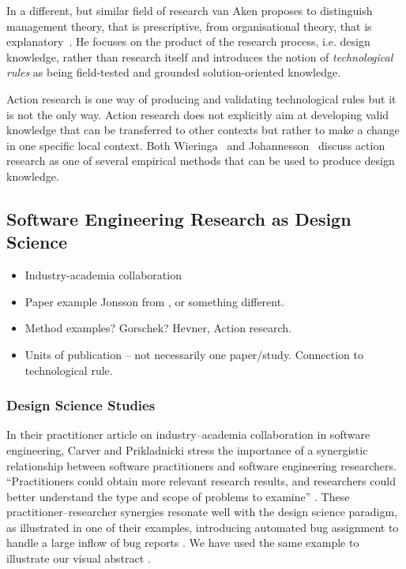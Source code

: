 \documentclass[graybox]{svmult}
\begin{document}
In a different, but similar field of research van Aken proposes to distinguish management theory, that is prescriptive, from organisational theory, that is explanatory~\cite{van_aken_management_2005}. He focuses on the product of the research process, i.e. design knowledge, rather than research itself and introduces the notion of \emph{technological rules} as being field-tested and grounded solution-oriented knowledge. 

Action research is one way of producing and validating technological rules but it is not the only way. Action research does not explicitly aim at developing valid knowledge that can be transferred to other contexts but rather to make a change in one specific local context. Both Wieringa~\cite{wieringa_technical_2012} and Johannesson~\cite{johannesson_introduction_2014} discuss action research as one of several empirical methods that can be used to produce design knowledge.






\subsection{Software Engineering Research as Design Science}
\begin{itemize}
\item Industry-academia collaboration
\item Paper example Jonsson \cite{JonssonBug15} from \cite{StoreyESEM17}, or something different.
\item Method examples? Gorschek? \cite{GorschekSW2006} Hevner, Action research.
\item Units of publication -- not necessarily one paper/study. Connection to technological rule.
\end{itemize}

\subsubsection{Design Science Studies}
In their practitioner article on industry--academia collaboration in software engineering, Carver and Prikladnicki stress the importance of a synergistic relationship between software practitioners and software engineering researchers. ``Practitioners could obtain more relevant research results, and researchers could better understand the type and scope of problems to examine'' \cite{CarverIEEESW2018}. These practitioner--researcher synergies resonate well with the design science paradigm, as illustrated in one of their examples, introducing automated bug assignment to handle a large inflow of bug reports \cite{JonssonBug15}. We have used the same example to illustrate our visual abstract \cite{StoreyESEM17}.
\end{document}
